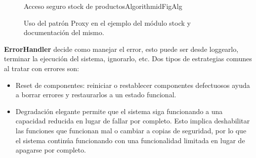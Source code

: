 \begin{figure}[H]
\caption{Uso del patrón Proxy en el ejemplo del módulo stock y documentación del mismo.}
\begin{center}
\end{center}

\begin{pattern}[]{Acceso seguro stock de productos}{Algorithm}{idFigAlg}
\assigns
{}

\end{pattern}

\end{figure}
\textbf{ErrorHandler} decide como manejar el error, esto puede ser desde loggearlo, terminar la ejecución del sistema, ignorarlo, etc. Dos tipos de estrategias comunes al tratar con errores son:
\begin{itemize}
    \item Reset de componentes: reiniciar o restablecer componentes defectuosos ayuda a borrar errores y restaurarlos a un estado funcional.
    \item Degradación elegante \cite{glass2009graceful} permite que el sistema siga funcionando a una capacidad reducida en lugar de fallar por completo. Esto implica deshabilitar las funciones que funcionan mal o cambiar a copias de seguridad, por lo que el sistema continúa funcionando con una funcionalidad limitada en lugar de apagarse por completo.
\end{itemize}


